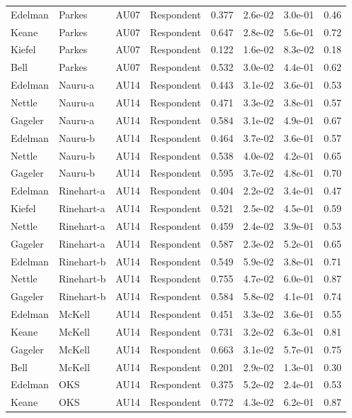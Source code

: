 \documentclass{monashthesis}
\begin{document}
\begin{center}
\begin{longtable}{llllllll}
Edelman & Parkes & AU07 & Respondent & 0.377 & 2.6e-02 & 3.0e-01 & 0.46 \\
Keane & Parkes & AU07 & Respondent & 0.647 & 2.8e-02 & 5.6e-01 & 0.72 \\
Kiefel & Parkes & AU07 & Respondent & 0.122 & 1.6e-02 & 8.3e-02 & 0.18 \\
Bell & Parkes & AU07 & Respondent & 0.532 & 3.0e-02 & 4.4e-01 & 0.62 \\
Edelman & Nauru-a & AU14 & Respondent & 0.443 & 3.1e-02 & 3.6e-01 & 0.53 \\
Nettle & Nauru-a & AU14 & Respondent & 0.471 & 3.3e-02 & 3.8e-01 & 0.57 \\
Gageler & Nauru-a & AU14 & Respondent & 0.584 & 3.1e-02 & 4.9e-01 & 0.67 \\
Edelman & Nauru-b & AU14 & Respondent & 0.464 & 3.7e-02 & 3.6e-01 & 0.57 \\
Nettle & Nauru-b & AU14 & Respondent & 0.538 & 4.0e-02 & 4.2e-01 & 0.65 \\
Gageler & Nauru-b & AU14 & Respondent & 0.595 & 3.7e-02 & 4.8e-01 & 0.70 \\
Edelman & Rinehart-a & AU14 & Respondent & 0.404 & 2.2e-02 & 3.4e-01 & 0.47 \\
Kiefel & Rinehart-a & AU14 & Respondent & 0.521 & 2.5e-02 & 4.5e-01 & 0.59 \\
Nettle & Rinehart-a & AU14 & Respondent & 0.459 & 2.4e-02 & 3.9e-01 & 0.53 \\
Gageler & Rinehart-a & AU14 & Respondent & 0.587 & 2.3e-02 & 5.2e-01 & 0.65 \\
Edelman & Rinehart-b & AU14 & Respondent & 0.549 & 5.9e-02 & 3.8e-01 & 0.71 \\
Nettle & Rinehart-b & AU14 & Respondent & 0.755 & 4.7e-02 & 6.0e-01 & 0.87 \\
Gageler & Rinehart-b & AU14 & Respondent & 0.584 & 5.8e-02 & 4.1e-01 & 0.74 \\
Edelman & McKell & AU14 & Respondent & 0.451 & 3.3e-02 & 3.6e-01 & 0.55 \\
Keane & McKell & AU14 & Respondent & 0.731 & 3.2e-02 & 6.3e-01 & 0.81 \\
Gageler & McKell & AU14 & Respondent & 0.663 & 3.1e-02 & 5.7e-01 & 0.75 \\
Bell & McKell & AU14 & Respondent & 0.201 & 2.9e-02 & 1.3e-01 & 0.30 \\
Edelman & OKS & AU14 & Respondent & 0.375 & 5.2e-02 & 2.4e-01 & 0.53 \\
Keane & OKS & AU14 & Respondent & 0.772 & 4.3e-02 & 6.2e-01 & 0.87 \\

\end{longtable}
\end{center}
\end{document}

